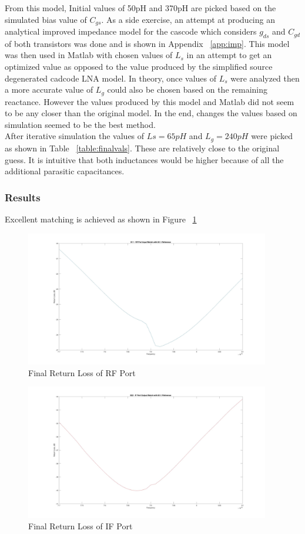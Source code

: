 \documentclass{article}                                                         %
\begin{document}
From this model, Initial values of 50pH and 370pH are picked based on the simulated bias value of $C_{gs}$.
As a side exercise, an attempt at producing an analytical improved impedance model for the cascode which considers $g_{ds}$
and $C_{gd}$ of both transistors was done and is shown in Appendix ~\ref{app:imp}.
This model was then used in Matlab with chosen values of $L_s$ in an attempt to get an optimized value as opposed to the value produced
by the simplified source degenerated cadcode LNA model. In theory, once values of $L_s$ were analyzed then a more accurate value of $L_g$ could
also be chosen based on the remaining reactance. However the values produced by this model and Matlab did not seem to be any closer
than the original model. In the end, changes the values based on simulation seemed to be the best method.\\

After iterative simulation the values of $Ls = 65pH$ and $L_g = 240pH$ were picked as shown in Table ~\ref{table:finalvals}.
These are relatively close to the original guess. It is intuitive that both inductances would be higher because of all the additional
parasitic capacitances. 

\subsubsection{Results}
Excellent matching is achieved as shown in Figure ~\ref{fig:matS11}
\begin{figure}[H]
  \centering
  \includegraphics[width=0.95\textwidth] {Plots/S11.jpg}
  \caption{Final Return Loss of RF Port}
    \label{fig:matS11}
\end{figure}
\begin{figure}[H]
  \centering
  \includegraphics[width=0.95\textwidth] {Plots/S22.jpg}
  \caption{Final Return Loss of IF Port}
    \label{fig:matS22}
\end{figure}
\end{document}
